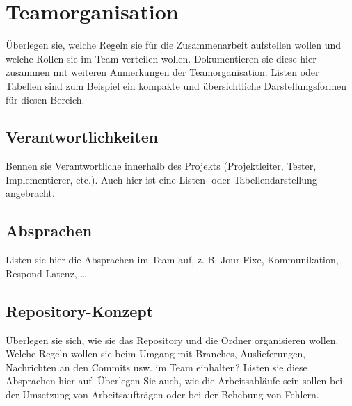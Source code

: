 \chapter{Teamorganisation}

Überlegen sie, welche Regeln sie für die Zusammenarbeit aufstellen
wollen und welche Rollen sie im Team verteilen wollen. Dokumentieren sie
diese hier zusammen mit weiteren Anmerkungen der Teamorganisation.
Listen oder Tabellen sind zum Beispiel ein kompakte und übersichtliche
Darstellungsformen für diesen Bereich.

\section{Verantwortlichkeiten}

Bennen sie Verantwortliche innerhalb des Projekts (Projektleiter,
Tester, Implementierer, etc.). Auch hier ist eine Listen- oder
Tabellendarstellung angebracht.

\section{Absprachen}

Listen sie hier die Absprachen im Team auf, z. B. Jour Fixe,
Kommunikation, Respond-Latenz, \ldots

\section{Repository-Konzept}

Überlegen sie sich, wie sie das Repository und die Ordner organisieren
wollen. Welche Regeln wollen sie beim Umgang mit Branches,
Auslieferungen, Nachrichten an den Commits usw. im Team einhalten?
Listen sie diese Absprachen hier auf. Überlegen Sie auch, wie die
Arbeitsabläufe sein sollen bei der Umsetzung von Arbeitsaufträgen oder
bei der Behebung von Fehlern.
